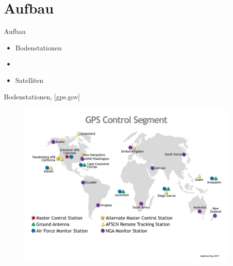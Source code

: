 \section{Aufbau}
\begin{frame}{Aufbau}
    \begin{itemize}
        \item Bodenstationen
        \item[]~
        \item Satelliten
    \end{itemize}
\end{frame}

\begin{frame}{Bodenstationen, {\small [gps.gov]}}
    \begin{figure}
        \centering
        \includegraphics[height=1.1\textheight]{images/GPS-control-segment-map.pdf}
    \end{figure}
\end{frame}


